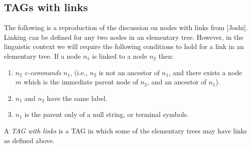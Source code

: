 \begin{fullwidth}
\subsection{TAGs with links}

\begin{defn}
The following is a reproduction of the discussion on nodes with links from [Joshi]. Linking can be defined for any two nodes in an elementary tree. However, in the linguistic context we will require the following conditions to hold for a link in an elementary tree. If a node $n_1$ is linked to a node $n_2$ then:
\begin{enumerate}
\item{$n_2$ \emph{c-commands} $n_1$, (i.e., $n_2$ is not an ancestor of $n_1$, and there exists a node $m$ which is the immediate parent node of $n_2$, and an ancestor of $n_1$).}
\item{$n_1$ and $n_2$ have the same label.}
\item{$n_1$ is the parent only of a null string, or terminal symbols.}
\end{enumerate}
A \emph{TAG with links} is a TAG in which some of the elementary trees may have links as defined above.
\end{defn}

\begin{example}
\[\]
\[\]
\[\]
\[\]
\end{example}

\end{fullwidth}
